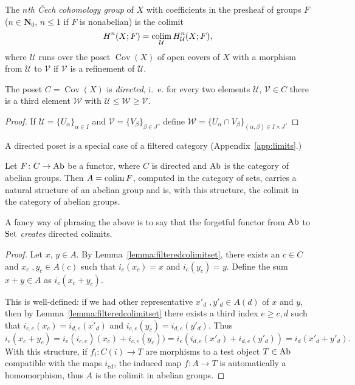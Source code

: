 \documentclass[a4paper,openany]{scrbook}
\DeclareMathOperator{\Cov}{Cov}
\begin{document}
\begin{defn}
The \emph{$n$th Čech cohomology group} of $X$ with coefficients in the presheaf of groups $F$ ($n \in \mathbf N_0$, $n \leq 1$ if $F$ is nonabelian) is the colimit
\[
H^n(X;F) = \operatorname*{colim}_{\mathcal U} H^n_{\mathcal U}(X;F),
\]
where $\mathcal U$ runs over the poset $\Cov(X)$ of open covers of $X$ with a morphism from $\mathcal U$ to $\mathcal V$ if $\mathcal V$ is a refinement of $\mathcal U$.
\end{defn}


\begin{lemma}
The poset $C = \Cov(X)$ is \emph{directed}, i.~e. for every two elements $\mathcal U$, $\mathcal V \in C$ there is a third element $\mathcal W$ with $\mathcal U \leq \mathcal W \geq \mathcal V$.
\end{lemma}
\begin{proof}
If $\mathcal U = \{U_\alpha\}_{\alpha \in I}$ and $\mathcal V = \{V_\beta\}_{\beta \in J}$, define $\mathcal W = \{U_\alpha \cap V_\beta\}_{(\alpha,\beta) \in I \times J}$.
\end{proof}

A directed poset is a special case of a filtered category (Appendix~\ref{app:limits}.)

\begin{lemma}\label{lemma:forgetfromabtosetcreatesdircolims}
Let $F\colon C \to \operatorname{Ab}$ be a functor, where $C$ is directed and $\operatorname{Ab}$ is the category of abelian groups. Then $A=\operatorname*{colim} F$, computed in the category of sets, carries a natural structure of an abelian group and is, with this structure, the colimit in the category of abelian groups.
\end{lemma}
A fancy way of phrasing the above is to say that the forgetful functor from $\operatorname{Ab}$ to $\operatorname{Set}$ \emph{creates} directed colimits.
\begin{proof}
Let $x$, $y \in A$. By Lemma~\ref{lemma:filteredcolimitset}, there exists an $c \in C$ and $x_c\;,y_c \in A(c)$ such that $i_c(x_c)=x$ and $i_c(y_c)=y$. Define the sum $x+y \in A$ as $i_c(x_c+y_c)$.

This is well-defined: if we had other representative $x'_d\;, y'_d \in A(d)$ of $x$ and $y$, then by Lemma~\ref{lemma:filteredcolimitset} there exists a third index $e \geq c,d$ such that $i_{c,e}(x_c)=i_{d,e}(x'_d)$ and $i_{c,e}(y_c)=i_{d,e}(y'_d)$. Thus
\[
i_c(x_c+y_c) = i_e(i_{c,e})(x_c)+i_{c,e}(y_c))=i_e(i_{d,e}(x'_d)+i_{d,e}(y'_d)) = i_d(x'_d+y'_d).
\]
With this structure, if $f_i\colon C(i) \to T$ are morphisms to a test object $T \in \operatorname{Ab}$ compatible with the maps $i_{cd}$, the induced map $f\colon A \to T$ is automatically a homomorphism, thus $A$ is the colimit in abelian groups.
\end{proof}
\end{document}
